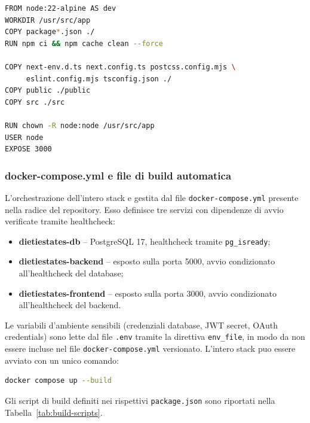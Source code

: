 \documentclass[a4paper,11pt]{article}
\begin{document}
\begin{lstlisting}[style=projectcode, language=bash]
FROM node:22-alpine AS dev
WORKDIR /usr/src/app
COPY package*.json ./
RUN npm ci && npm cache clean --force

COPY next-env.d.ts next.config.ts postcss.config.mjs \
     eslint.config.mjs tsconfig.json ./
COPY public ./public
COPY src ./src

RUN chown -R node:node /usr/src/app
USER node
EXPOSE 3000
\end{lstlisting}

\subsubsection{docker-compose.yml e file di build automatica}

L'orchestrazione dell'intero stack e gestita dal file \texttt{docker-compose.yml} presente nella radice del repository. Esso definisce tre servizi con dipendenze di avvio verificate tramite healthcheck:
\begin{itemize}
  \item \textbf{dietiestates-db} -- PostgreSQL 17, healthcheck tramite \texttt{pg\_isready};
  \item \textbf{dietiestates-backend} -- esposto sulla porta 5000, avvio condizionato all'healthcheck del database;
  \item \textbf{dietiestates-frontend} -- esposto sulla porta 3000, avvio condizionato all'healthcheck del backend.
\end{itemize}

Le variabili d'ambiente sensibili (credenziali database, JWT secret, OAuth credentials) sono lette dal file \texttt{.env} tramite la direttiva \texttt{env\_file}, in modo da non essere incluse nel file \texttt{docker-compose.yml} versionato. L'intero stack puo essere avviato con un unico comando:

\begin{lstlisting}[style=projectcode, language=bash]
docker compose up --build
\end{lstlisting}

Gli script di build definiti nei rispettivi \texttt{package.json} sono riportati nella Tabella~\ref{tab:build-scripts}.
\end{document}
